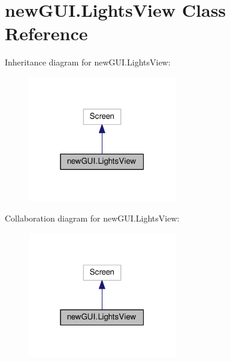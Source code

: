 \hypertarget{classnewGUI_1_1LightsView}{}\section{new\+G\+U\+I.\+Lights\+View Class Reference}
\label{classnewGUI_1_1LightsView}


Inheritance diagram for new\+G\+U\+I.\+Lights\+View\+:\nopagebreak
\begin{figure}[H]
\begin{center}
\leavevmode
\includegraphics[width=184pt]{classnewGUI_1_1LightsView__inherit__graph}
\end{center}
\end{figure}


Collaboration diagram for new\+G\+U\+I.\+Lights\+View\+:\nopagebreak
\begin{figure}[H]
\begin{center}
\leavevmode
\includegraphics[width=184pt]{classnewGUI_1_1LightsView__coll__graph}
\end{center}
\end{figure}
